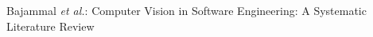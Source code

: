 \documentclass[10pt,journal,compsoc]{IEEEtran}
\begin{document}
% 
%



%
{Bajammal \MakeLowercase{\textit{et al.}}: Computer Vision in Software Engineering: A Systematic Literature Review}
% 






\end{document}
